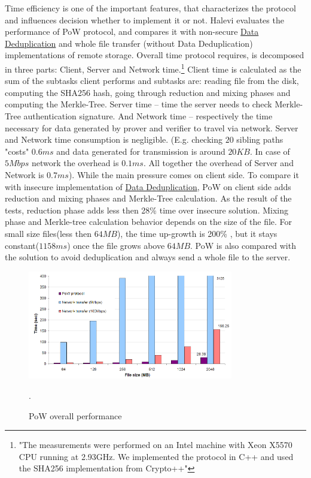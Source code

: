 \documentclass[12pt]{article}
\begin{document}
Time efficiency is one of the important features, that characterizes the protocol and influences decision whether to implement it or not. Halevi evaluates the performance of PoW protocol, and  compares it with non-secure  \hyperref [sub:Deduplication]{Data Deduplication} and whole file transfer (without Data Deduplication) implementations of remote storage. Overall time protocol requires, is decomposed in three parts: Client, Server and Network time.\footnote{"The measurements were performed on an Intel machine with Xeon X5570 CPU running at 2.93GHz. We implemented the protocol in C++ and used the SHA256 implementation from Crypto++"} Client time is calculated as the sum of the subtasks client performs and subtasks are: reading file from the disk, computing the SHA256 hash, going through reduction and mixing phases and  computing the Merkle-Tree. Server time --  time the server needs to check Merkle-Tree authentication signature. And Network time -- respectively the time necessary for data generated by prover and verifier to travel via network. Server and Network time consumption is negligible. (E.g. checking $20$ sibling paths "costs" $0.6ms$ and data generated for transmission  is around $20KB$. In case of $5Mbps$ network the overhead is $0.1 ms$. All together the overhead of Server and Network is $0.7 ms$). While the main pressure comes on client side. To  compare it with insecure implementation of \hyperref [sub:Deduplication]{Data Deduplication}, PoW on client side adds reduction and mixing phases and Merkle-Tree calculation. As the result of the tests, reduction phase adds less then 28\% time over insecure solution. Mixing phase and Merkle-tree calculation behavior depends on the size of the file. For small size files(less then $64MB$), the time up-growth is 200\% , but it stays  constant($1158ms$) once the file grows above $64MB$. PoW is also compared with the solution to avoid deduplication and always send a whole file to the server.


\begin{figure}[ht] 
\begin{center}
\includegraphics[width=0.8\textwidth]{PoWgraph}
\caption{PoW overall performance\cite{PoW}}
\label{fig:PoWgraph} .
\end{center}
\end{figure}
\end{document}
